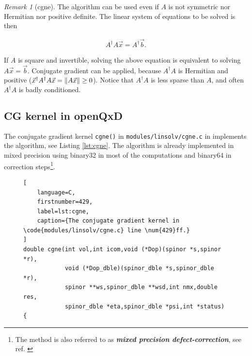 \documentclass{article}
\theoremstyle{plain} %
\theoremstyle{convention} %
\theoremstyle{remark} %
\newtheorem*{remark}{Remark} %
\def\code#1{\texttt{#1}}
\def\df#1{\textbf{\textit{#1}}}
\numberwithin{equation}{section}
\begin{document}
\begin{remark}[\acrfull{cgne}]
    The algorithm can be used even if $A$ is not symmetric nor Hermitian nor positive definite. The linear system of equations to be solved is then

    \begin{align*}
        A^{\dagger} A \vec{x} = A^{\dagger} \vec{b}.
    \end{align*}

    If $A$ is square and invertible, solving the above equation is equivalent to solving $A \vec{x} = \vec{b}$. Conjugate gradient can be applied, because $A^{\dagger} A$ is Hermitian and positive ($\vec{x}^{\dagger} A^{\dagger} A \vec{x} = \norm{A \vec{x}} \ge 0$). Notice that $A^{\dagger} A$ is less sparse than $A$, and often $A^{\dagger} A$ is badly conditioned.

\end{remark}


\subsection{CG kernel in openQxD}

\label{sec:fp_in_openqxd}

The conjugate gradient kernel \code{cgne()} in \code{modules/linsolv/cgne.c} in \cite{openqxd} implements the algorithm, see Listing \ref{lst:cgne}. The algorithm is already implemented in mixed precision using \gls{binary32} in most of the computations and \gls{binary64} in correction steps\footnote{The method is also referred to as \df{mixed precision defect-correction}, see ref. \cite{goddeke2005}}.

\begin{figure} %
\begin{lstlisting}[
    language=C,
    firstnumber=429,
    label=lst:cgne,
    caption={The conjugate gradient kernel in \code{modules/linsolv/cgne.c} line \num{429}ff.}
]
double cgne(int vol,int icom,void (*Dop)(spinor *s,spinor *r),
            void (*Dop_dble)(spinor_dble *s,spinor_dble *r),
            spinor **ws,spinor_dble **wsd,int nmx,double res,
            spinor_dble *eta,spinor_dble *psi,int *status)
{
\end{lstlisting}
\end{figure} 
\end{document}
